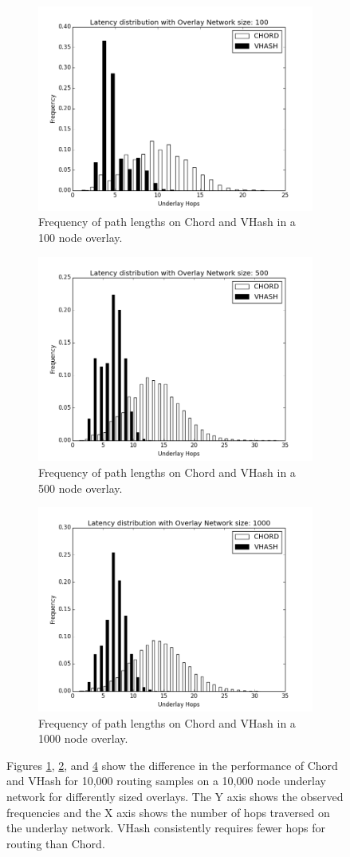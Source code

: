 \begin{figure}

\begin{subfigure}{\columnwidth}
\centering
	\includegraphics[width=0.5\linewidth]{figs/hist_100}
	\caption{Frequency of path lengths on Chord and VHash in a 100 node overlay.}
	\label{fig:hist100}
\end{subfigure}

\begin{subfigure}{\columnwidth}
	\centering
	\includegraphics[width=0.5\linewidth]{figs/hist_500}
	\caption{Frequency of path lengths on Chord and VHash in a 500 node overlay.}
	\label{fig:hist500}
\end{subfigure}

\begin{subfigure}{\columnwidth}
	\centering
	\includegraphics[width=0.5\linewidth]{figs/hist_1000}
	\caption{Frequency of path lengths on Chord and VHash in a 1000 node overlay.}
	\label{fig:hist1000}
\end{subfigure}

\caption{Figures \ref{fig:hist100}, \ref{fig:hist500}, and \ref{fig:hist1000} show the difference in the performance of Chord and VHash for 10,000 routing samples on a 10,000 node underlay network for differently sized overlays.
The Y axis shows the observed frequencies and the X axis shows the number of hops traversed on the underlay network.
VHash consistently requires fewer hops for routing than Chord.}
\end{figure}




